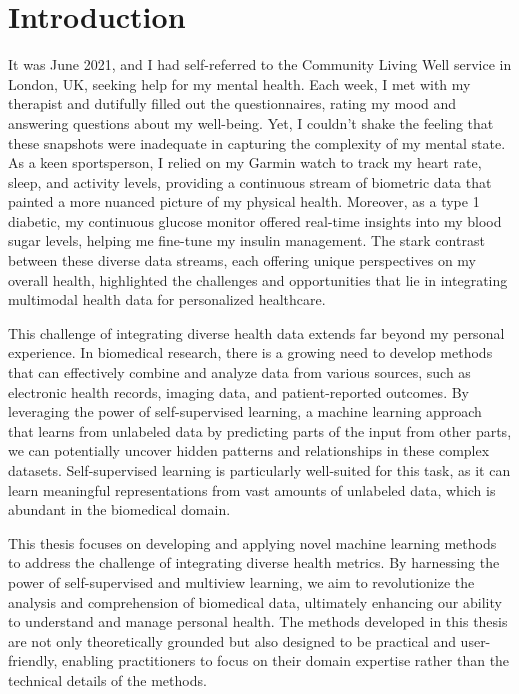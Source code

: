 \chapter{Introduction}\label{chap:introduction}

It was June 2021, and I had self-referred to the Community Living Well service in London, UK, seeking help for my mental health. Each week, I met with my therapist and dutifully filled out the questionnaires, rating my mood and answering questions about my well-being. Yet, I couldn't shake the feeling that these snapshots were inadequate in capturing the complexity of my mental state. As a keen sportsperson, I relied on my Garmin watch to track my heart rate, sleep, and activity levels, providing a continuous stream of biometric data that painted a more nuanced picture of my physical health. Moreover, as a type 1 diabetic, my continuous glucose monitor offered real-time insights into my blood sugar levels, helping me fine-tune my insulin management. The stark contrast between these diverse data streams, each offering unique perspectives on my overall health, highlighted the challenges and opportunities that lie in integrating multimodal health data for personalized healthcare.

This challenge of integrating diverse health data extends far beyond my personal experience. In biomedical research, there is a growing need to develop methods that can effectively combine and analyze data from various sources, such as electronic health records, imaging data, and patient-reported outcomes. By leveraging the power of self-supervised learning, a machine learning approach that learns from unlabeled data by predicting parts of the input from other parts, we can potentially uncover hidden patterns and relationships in these complex datasets. Self-supervised learning is particularly well-suited for this task, as it can learn meaningful representations from vast amounts of unlabeled data, which is abundant in the biomedical domain.

This thesis focuses on developing and applying novel machine learning methods to address the challenge of integrating diverse health metrics. By harnessing the power of self-supervised and multiview learning, we aim to revolutionize the analysis and comprehension of biomedical data, ultimately enhancing our ability to understand and manage personal health. The methods developed in this thesis are not only theoretically grounded but also designed to be practical and user-friendly, enabling practitioners to focus on their domain expertise rather than the technical details of the methods.

